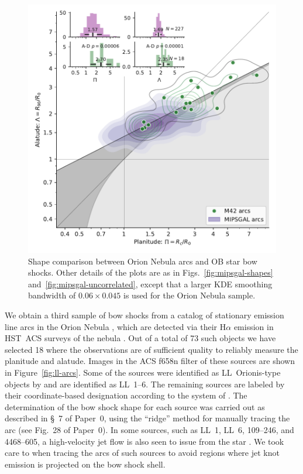 \begin{figure}
  \centering
  \includegraphics[width=\linewidth]{figs/mipsgal-Rc-R90-vs-Orion}
  \caption[]{Shape comparison between Orion Nebula arcs and OB star
    bow shocks.  Other details of the plots are as in
    Figs.~\ref{fig:mipsgal-shapes} and~\ref{fig:mipsgal-uncorrelated},
    except that a larger KDE smoothing bandwidth of
    \(0.06 \times 0.045\) is used for the Orion Nebula sample.}
  \label{fig:ll-compare-mipsgal}
\end{figure}


We obtain a third sample of bow shocks from a catalog of stationary
emission line arcs in the Orion Nebula \citep{Bally:2000a}, which are
detected via their H\(\alpha\) emission in HST~ACS surveys of the nebula
\citep{Bally:2006a, Robberto:2013a}.  Out of a total of 73 such
objects \citep{Gutierrez-Soto:2015a} we have selected 18 where the
observations are of sufficient quality to reliably measure the
planitude and alatude.  Images in the ACS f658n filter of these
sources are shown in Figure~\ref{fig:ll-arcs}.  Some of the sources
were identified as LL~Orionis-type objects by \citet{Bally:2001a} and
are identified as LL~1--6. The remaining sources are labeled by their
coordinate-based designation according to the system of
\citet{ODell:1994a}.  The determination of the bow shock shape for
each source was carried out as described in \S~7 of Paper~0, using the
``ridge'' method for manually tracing the arc (see Fig.~28 of
Paper~0).  In some sources, such as LL~1, LL~6, 109--246, and 4468--605,
a high-velocity jet flow is also seen to issue from the star
\citep{Bally:2006a, Henney:2013a}.  We took care to when tracing the
arcs of such sources to avoid regions where jet knot emission is
projected on the bow shock shell.


